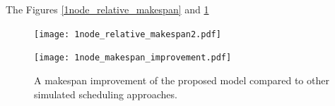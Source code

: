 \documentclass{svjour3}                     %
\begin{document}
The Figures \ref{1node_relative_makespan} and \ref{1node_makespan_improvement} 
%
\begin{figure}
\centering
\begin{minipage}{1\textwidth}
\centering
    \texttt{[image: 1node\_relative\_makespan2.pdf]}
    \caption{Dependence of the data production makespan on the network bandwidth using a single remote node. %
    The makespan is given in units equal to 9 days, 15 hours, 39 minutes and 13 seconds which is the makespan of the no\_network approach.}
    \label{1node_relative_makespan}
\end{minipage}\hspace{3mm}%

\begin{minipage}{1\textwidth}
\centering
    \texttt{[image: 1node\_makespan\_improvement.pdf]}
    \caption{A makespan improvement of the proposed model compared to other simulated scheduling approaches. %
    }
    \label{1node_makespan_improvement}
\end{minipage} 
\end{figure}
%
\end{document}
